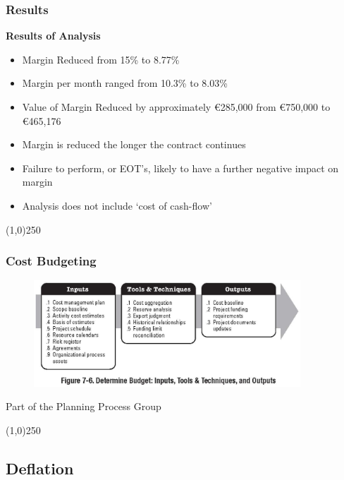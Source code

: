 \begin{frame}
\frametitle{Results}
\textbf{Results of Analysis}
\begin{itemize}
	\item Margin Reduced from 15\% to 8.77\%
	\item Margin per month ranged from 10.3\% to 8.03\%
	\item Value of Margin Reduced by approximately \euro285,000 from \euro750,000 to \euro465,176
	\item Margin is reduced the longer the contract continues
\end{itemize}
\begin{itemize}
	\item Failure to perform, or EOT’s, likely to have a further negative impact on margin
	\item Analysis does not include ‘cost of cash-flow’
\end{itemize}
\end{frame}
\begin{center}\line(1,0){250}\end{center}










\begin{frame}
\frametitle{Cost Budgeting}
\begin{figure}
	\centering
		\includegraphics[width = 10cm]{images/Fig7-6.jpg}
	\label{fig:7-6a}
\end{figure}
Part of the Planning Process Group
\end{frame}
\begin{center}\line(1,0){250}\end{center}




\subsection{Deflation}

